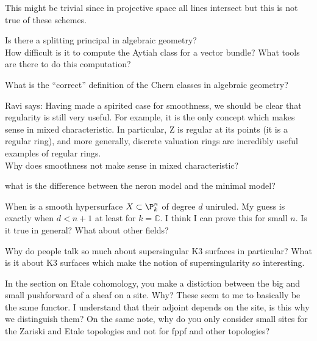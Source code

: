 \documentclass[12pt]{article}
\begin{document}
This might be trivial since in projective space all lines intersect but this is not true of these schemes.

\begin{exercise}
Is there a splitting principal in algebraic geometry? 
\\
How difficult is it to compute the Aytiah class for a vector bundle? What tools are there to do this computation?
\end{exercise}

\begin{exercise}
What is the ``correct'' definition of the Chern classes in algebraic geometry?
\end{exercise}

\begin{exercise}
Ravi says:
Having made a spirited case for smoothness, we
should be clear that regularity is still very useful. For example, it is the only concept which makes sense in mixed characteristic. In particular, Z is regular at its
points (it is a regular ring), and more generally, discrete valuation rings are incredibly useful examples of regular rings.
\bigskip\\
Why does smoothness not make sense in mixed characteristic?
\end{exercise}

\begin{exercise}
what is the difference between the neron model and the minimal model?
\end{exercise}

\begin{exercise}
When is a smooth hypersurface $X \subset \P^n_k$ of degree $d$ uniruled. My guess is exactly when $d < n + 1$ at least for $k = \mathbb{C}$. I think I can prove this for small $n$. Is it true in general? What about other fields? 
\end{exercise}

\begin{exercise}
Why do people talk so much about supersingular K3 surfaces in particular? What is it about K3 surfaces which make the notion of supersingularity so interesting. 
\end{exercise}

\begin{exercise}
In the section on Etale cohomology, you make a distiction between the big and small pushforward of a sheaf on a site. Why? These seem to me to basically be the same functor. I understand that their adjoint depends on the site, is this why we distinguish them? On the same note, why do you only consider small sites for the Zariski and Etale topologies and not for fppf and other topologies?
\end{exercise}
\end{document}
